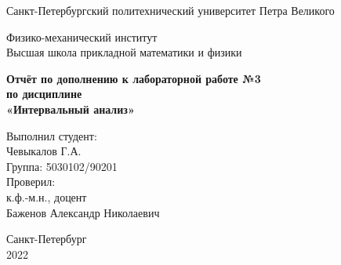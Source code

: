 \begin{titlepage}
	\newpage
	
	\begin{center}
		\textrm{\large Санкт-Петербургский политехнический университет \linebreak Петра Великого \\}
	\end{center}
	
	\begin{center}
			\textrm{\large Физико-механический институт \\ Высшая школа прикладной математики и физики \\}
	\end{center}

	\vspace{10em}
	
	\begin{center}
		\textrm{\textbf{\large Отчёт \linebreak по дополнению к лабораторной работе №3 \\
				по дисциплине \\ «Интервальный анализ»}}
	\end{center}
	
	\vspace{8em}
	
	\hfill\parbox{11cm}{
		\hspace*{4cm}Выполнил студент: \\
		\hspace*{4cm}Чевыкалов Г.А. \\
		\hspace*{4cm}Группа: 5030102/90201 \\
		\hspace*{4cm}Проверил: \\
		\hspace*{4cm}к.ф.-м.н., доцент \\
		\hspace*{4cm}Баженов Александр Николаевич \\
	}
	
	
	\vspace{\fill}
	
	\begin{center}
		Санкт-Петербург \\ 2022
	\end{center}
	
\end{titlepage}